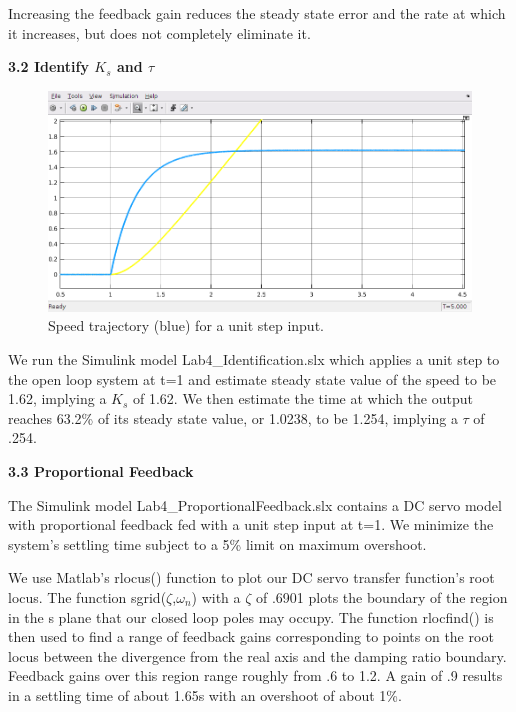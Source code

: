 \documentclass[11pt,a4paper]{article}
\begin{document}
\begin{enumerate}
Increasing the feedback gain reduces the steady state error and the rate at which it increases, but does not completely eliminate it.
	
\end{enumerate}

\textbf{3.2 Identify $K_{s}$ and $\tau$}

\begin{figure}[!htbp]
	\includegraphics[width=\textwidth]{imglab/lab4sol_identification.png}
	\caption{Speed trajectory (blue) for a unit step input.}
\end{figure}

We run the Simulink model Lab4\_Identification.slx which applies a unit step to the open loop system at t=1 and estimate steady state value of the speed to be 1.62, implying a $K_{s}$ of 1.62. We then estimate the time at which the output reaches 63.2\% of its steady state value, or 1.0238, to be 1.254, implying a $\tau$ of .254.


\textbf{3.3 Proportional Feedback}

	The Simulink model Lab4\_ProportionalFeedback.slx contains a DC servo model with proportional feedback fed with a unit step input at t=1. We minimize the system's settling time subject to a 5\% limit on maximum overshoot. 	
	
	We use Matlab's rlocus() function to plot our DC servo transfer function's root locus. The function sgrid($\zeta$,$\omega_{n}$) with a $\zeta$ of .6901 plots the boundary of the region in the s plane that our closed loop poles may occupy. The function rlocfind() is then used to find a range of feedback gains corresponding to points on the root locus between the divergence from the real axis and the damping ratio boundary. Feedback gains over this region range roughly from .6 to 1.2. A gain of .9 results in a settling time of about 1.65s with an overshoot of about 1\%.
\end{document}

